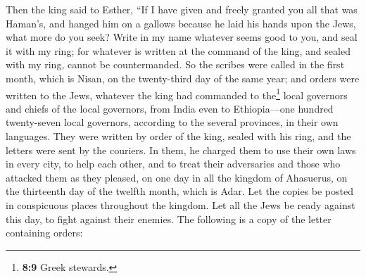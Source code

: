  Then the king said to Esther, ``If I have given and
freely granted you all that was Haman's, and hanged him on a gallows
because he laid his hands upon the Jews, what more do you seek?
 Write in my name whatever seems good to you, and seal it
with my ring; for whatever is written at the command of the king, and
sealed with my ring, cannot be countermanded.  So the
scribes were called in the first month, which is Nisan, on the
twenty-third day of the same year; and orders were written to the Jews,
whatever the king had commanded to the\footnote{\textbf{8:9} Greek
  stewards.} local governors and chiefs of the local governors, from
India even to Ethiopia---one hundred twenty-seven local governors,
according to the several provinces, in their own languages.
 They were written by order of the king, sealed with his
ring, and the letters were sent by the couriers.  In
them, he charged them to use their own laws in every city, to help each
other, and to treat their adversaries and those who attacked them as
they pleased,  on one day in all the kingdom of
Ahasuerus, on the thirteenth day of the twelfth month, which is Adar.
 Let the copies be posted in conspicuous places
throughout the kingdom. Let all the Jews be ready against this day, to
fight against their enemies. The following is a copy of the letter
containing orders:

